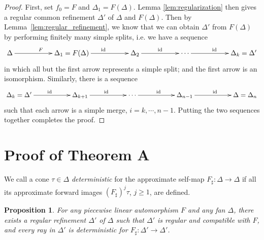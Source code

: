 \documentclass[11pt]{amsart}
\theoremstyle{definition}
\theoremstyle{plain}
\newtheorem{prop}[thm]{Proposition}
\theoremstyle{remark}
\numberwithin{equation}{section}
\DeclareMathOperator{\id}{id}
\def\fan{\Delta}
\begin{document}
\begin{proof}
First, set $f_0=F$ and $\fan_1=F(\fan)$. Lemma \ref{lem:regularization} then gives a regular common refinement $\fan'$ of $\fan$ and $F(\fan)$. Then by Lemma~\ref{lem:regular_refinement}, we know that we can obtain $\fan'$ from $F(\fan)$ by performing finitely many simple splits, i.e. we have a sequence
\[
\xymatrix{
\fan \ar[rr]^{F} && \fan_1=F(\fan) \ar[rr]^{\id} && \fan_2 \ar[rr]^{\id}
&&\cdots \ar[rr]^{\id} &&
\fan_k=\fan'
}
\]
in which all but the first arrow represents a simple split; and the first arrow is an isomorphism.  Similarly, there is a sequence
\[
\xymatrix{
\fan_k=\fan' \ar[rr]^{\id} && \fan_{k+1} \ar[rr]^{\id} &&\cdots \ar[rr]^{\id}
&& \fan_{n-1} \ar[rr]^{\id} &&
\fan = \fan_n
}
\]
such that each arrow is a simple merge, $i=k,\cdots,n-1$.  Putting the two sequences together completes the proof.
\end{proof}


\section{Proof of Theorem A}
\label{Sec:proof}
We call a cone $\tau\in\Delta$ {\em deterministic} for the approximate self-map $F_\sharp:\Delta\to\Delta$ if all its approximate forward images $(F_\sharp)^j\tau$, $j\ge 1$, are defined. 

\begin{prop}
For any piecewise linear automorphism $F$ and any fan $\fan$, there exists a regular refinement $\fan'$ of $\fan$ such that $\fan'$ is regular and compatible with $F$, and every ray in $\fan'$ is deterministic for $F_\sharp:\Delta'\to\Delta'$.
\end{prop}
\end{document}
